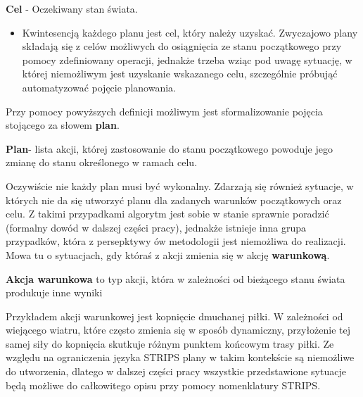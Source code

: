    \begin{definition}
    \label{Cel}
        \textbf{Cel} - Oczekiwany stan świata.
    \end{definition}
    \begin{itemize}
        \item Kwintesencją każdego planu jest cel, który należy uzyskać. Zwyczajowo plany składają się z celów możliwych do
        osiągnięcia ze stanu początkowego przy pomocy zdefiniowany operacji, jednakże trzeba wziąc pod uwagę sytuację, w której 
        niemożliwym jest uzyskanie wskazanego celu, szczególnie próbująć automatyzować pojęcie planowania.
    \end{itemize} 
    Przy pomocy powyższych definicji możliwym jest sformalizowanie pojęcia stojącego za słowem \textbf{plan}. 
    \begin{definition}
    \label{Plan}
    \textbf{Plan}- lista akcji, której zastosowanie do stanu początkowego powoduje jego zmianę do stanu określonego w ramach celu. 
    \end{definition}

    Oczywiście nie każdy plan musi być wykonalny. Zdarzają się również sytuacje, w których nie da się utworzyć planu dla zadanych warunków 
    początkowych oraz celu. Z takimi przypadkami algorytm jest sobie w stanie sprawnie poradzić (formalny dowód w dalszej części pracy), 
    jednakże istnieje inna grupa przypadków, która z persepktywy ów metodologii jest niemożliwa do realizacji. 
    Mowa tu o sytuacjach, gdy któraś z akcji zmienia się w akcję \textbf{warunkową}.
    \begin{definition}
        \label{Akcja warunkowa}
        \textbf{Akcja warunkowa} to typ akcji, która w zależności od bieżącego stanu świata produkuje inne wyniki
    \end{definition}

    Przykładem akcji warunkowej jest kopnięcie dmuchanej piłki. W zależności od wiejącego wiatru, które często zmienia się w sposób dynamiczny, 
    przyłożenie tej samej siły do kopnięcia skutkuje różnym punktem końcowym trasy piłki. Ze względu na ograniczenia języka STRIPS plany w 
    takim kontekście są niemożliwe do utworzenia, dlatego w dalszej części pracy wszystkie przedstawione sytuacje będą możliwe do całkowitego 
    opisu przy pomocy nomenklatury STRIPS.
    
